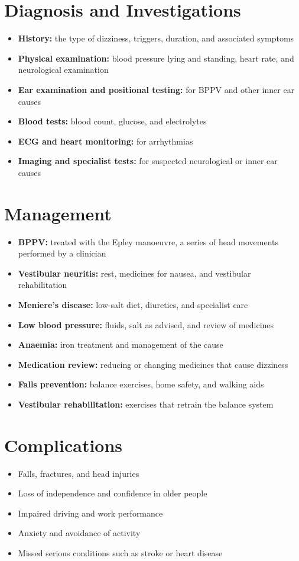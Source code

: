\section*{Diagnosis and Investigations}
\begin{itemize}
    \item \textbf{History:} the type of dizziness, triggers, duration, and associated symptoms
    \item \textbf{Physical examination:} blood pressure lying and standing, heart rate, and neurological examination
    \item \textbf{Ear examination and positional testing:} for BPPV and other inner ear causes
    \item \textbf{Blood tests:} blood count, glucose, and electrolytes
    \item \textbf{ECG and heart monitoring:} for arrhythmias
    \item \textbf{Imaging and specialist tests:} for suspected neurological or inner ear causes
\end{itemize}

\section*{Management}
\begin{itemize}
    \item \textbf{BPPV:} treated with the Epley manoeuvre, a series of head movements performed by a clinician
    \item \textbf{Vestibular neuritis:} rest, medicines for nausea, and vestibular rehabilitation
    \item \textbf{Meniere's disease:} low-salt diet, diuretics, and specialist care
    \item \textbf{Low blood pressure:} fluids, salt as advised, and review of medicines
    \item \textbf{Anaemia:} iron treatment and management of the cause
    \item \textbf{Medication review:} reducing or changing medicines that cause dizziness
    \item \textbf{Falls prevention:} balance exercises, home safety, and walking aids
    \item \textbf{Vestibular rehabilitation:} exercises that retrain the balance system
\end{itemize}

\section*{Complications}
\begin{itemize}
    \item Falls, fractures, and head injuries
    \item Loss of independence and confidence in older people
    \item Impaired driving and work performance
    \item Anxiety and avoidance of activity
    \item Missed serious conditions such as stroke or heart disease
\end{itemize}

